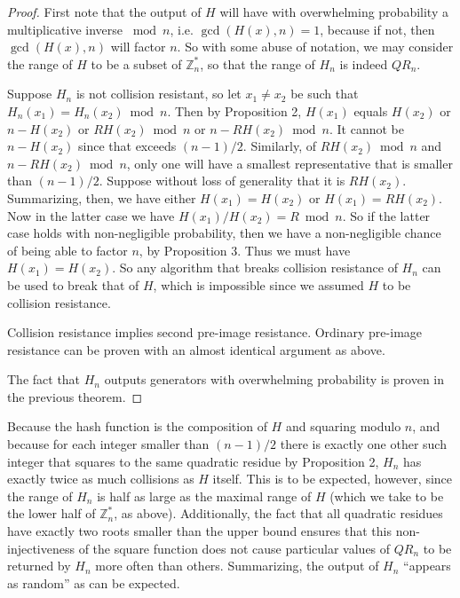 \documentclass[a4paper,12pt]{article}
\newcommand{\Z}{\mathbb{Z}}
\begin{document}
\begin{proof}
First note that the output of $H$ will have with overwhelming probability a multiplicative inverse ${}\bmod n$, i.e. $\gcd(H(x), n) = 1$, because if not, then $\gcd(H(x), n)$ will factor $n$. So with some abuse of notation, we may consider the range of $H$ to be a subset of $\Z^*_n$, so that the range of $H_n$ is indeed $QR_n$.

Suppose $H_n$ is not collision resistant, so let $x_1 \neq x_2$ be such that $H_n(x_1) = H_n(x_2) \bmod n$. Then by Proposition 2, $H(x_1)$ equals $H(x_2)$ or $n - H(x_2)$ or $RH(x_2) \bmod n$ or $n - RH(x_2) \bmod n$. It cannot be $n - H(x_2)$ since that exceeds $(n-1)/2$. Similarly, of $RH(x_2) \bmod n$ and $n - RH(x_2) \bmod n$, only one will have a smallest representative that is smaller than $(n-1)/2$. Suppose without loss of generality that it is $RH(x_2)$. Summarizing, then, we have either $H(x_1) = H(x_2)$ or $H(x_1) = RH(x_2)$. Now in the latter case we have $H(x_1)/H(x_2) = R \bmod n$. So if the latter case holds with non-negligible probability, then we have a non-negligible chance of being able to factor $n$, by Proposition 3. Thus we must have $H(x_1) = H(x_2)$. So any algorithm that breaks collision resistance of $H_n$ can be used to break that of $H$, which is impossible since we assumed $H$ to be collision resistance.

Collision resistance implies second pre-image resistance. Ordinary pre-image resistance can be proven with an almost identical argument as above.

The fact that $H_n$ outputs generators with overwhelming probability is proven in the previous theorem.
\end{proof}

\noindent Because the hash function is the composition of $H$ and squaring modulo $n$, and because for each integer smaller than $(n-1)/2$ there is exactly one other such integer that squares to the same quadratic residue by Proposition 2, $H_n$ has exactly twice as much collisions as $H$ itself. This is to be expected, however, since the range of $H_n$ is half as large as the maximal range of $H$ (which we take to be the lower half of $\Z^*_n$, as above). Additionally, the fact that all quadratic residues have exactly two roots smaller than the upper bound ensures that this non-injectiveness of the square function does not cause particular values of $QR_n$ to be returned by $H_n$ more often than others. Summarizing, the output of $H_n$ ``appears as random'' as can be expected.
\end{document}
